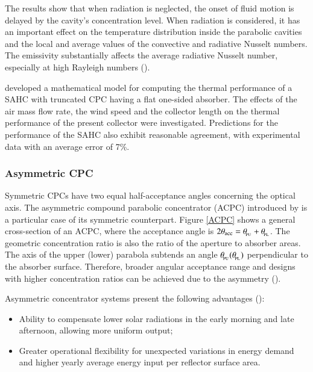 The results show that when radiation is neglected, the onset of fluid motion is delayed by the cavity's concentration level. When radiation is considered, it has an important effect on the temperature distribution inside the parabolic cavities and the local and average values of the convective and radiative Nusselt numbers. The emissivity substantially affects the average radiative Nusselt number, especially at high Rayleigh numbers (\cite{Diaz2008}).

\citet{Tchinda2008} developed a mathematical model for computing the thermal performance of a SAHC with truncated CPC having a flat one-sided absorber. The effects of the air mass flow rate, the wind speed and the collector length on the thermal performance of the present collector were investigated. Predictions for the performance of the SAHC also exhibit reasonable agreement, with experimental data with an average error of 7\%.

\subsubsection{Asymmetric CPC}

Symmetric CPCs have two equal half-acceptance angles concerning the optical axis. The asymmetric compound parabolic concentrator (ACPC) introduced by \citet{Rabl1976} is a particular case of its symmetric counterpart. Figure \ref{ACPC} shows a general cross-section of an ACPC, where the acceptance angle is $\rm{2\theta_{acc} = \theta_{\!_{PU}} + \theta_{\!_{PL}}}$. The geometric concentration ratio is also the ratio of the aperture to absorber areas. The axis of the upper (lower) parabola subtends an angle $\rm{\theta_{\!_{PU}} (\theta_{\!_{PL}})}$ perpendicular to the absorber surface. Therefore, broader angular acceptance range and designs with higher concentration ratios can be achieved due to the asymmetry (\cite{Tian2018}). 


Asymmetric concentrator systems present the following advantages (\cite{Mills1978}):

\begin{itemize}
	\item Ability to compensate lower solar radiations in the early morning and late afternoon, allowing more uniform output;
	\item Greater operational flexibility for unexpected variations in energy demand and higher yearly average energy input per reflector surface area.
\end{itemize}

